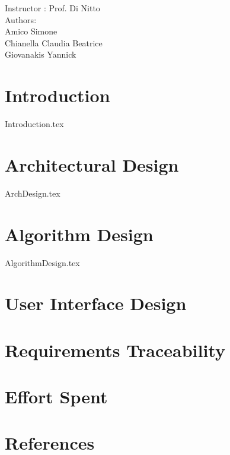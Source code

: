 \documentclass[12pt]{article}
\begin{document}
	\begin{center}
	 	{\Large Instructor : Prof. Di Nitto}
	 	 \vspace{5mm}\\	 
	 	{\Large Authors:}\\
	 	{\Large Amico Simone}\\
	 	{\Large Chianella Claudia Beatrice}\\
	 	{\Large Giovanakis Yannick}
	\end{center}
	 
	\newpage
	
	
	\tableofcontents{}
	 
	\newpage
		
	
	\section{Introduction}
	{Introduction.tex}
	
	
	\section{Architectural Design}
	{ArchDesign.tex}
	
		
	
	\section{Algorithm Design}
	{AlgorithmDesign.tex}
	\newpage
	
		
	\section{User Interface Design}
	\newpage
	
		
	
	\section{Requirements Traceability}
	\newpage
	
		
	
	\section{Effort Spent}
	\newpage
	
		
	
	\section{References}

	 
	
\end{document}
